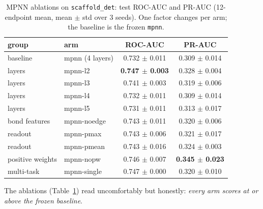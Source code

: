 \documentclass[conference]{IEEEtran}
\newcommand{\code}[1]{\texttt{\small #1}}
\begin{document}
\begin{table}[t]
\centering
\caption{MPNN ablations on \code{scaffold\_det}: test ROC-AUC and PR-AUC (12-endpoint mean,
mean $\pm$ std over 3 seeds). One factor changes per arm; the baseline is the frozen
\code{mpnn}.}
\label{tab:gnn-ablation}
\small
\begin{tabular}{llcc}
\toprule
group & arm & ROC-AUC & PR-AUC \\
\midrule
baseline & mpnn (4 layers) & 0.732 $\pm$ 0.011 & 0.309 $\pm$ 0.014 \\
\midrule
layers & mpnn-l2 & \textbf{0.747 $\pm$ 0.003} & 0.328 $\pm$ 0.004 \\
layers & mpnn-l3 & 0.741 $\pm$ 0.003 & 0.319 $\pm$ 0.006 \\
layers & mpnn-l4 & 0.732 $\pm$ 0.011 & 0.309 $\pm$ 0.014 \\
layers & mpnn-l5 & 0.731 $\pm$ 0.011 & 0.313 $\pm$ 0.017 \\
\midrule
bond features & mpnn-noedge & 0.743 $\pm$ 0.011 & 0.320 $\pm$ 0.006 \\
readout & mpnn-pmax & 0.743 $\pm$ 0.006 & 0.321 $\pm$ 0.017 \\
readout & mpnn-pmean & 0.743 $\pm$ 0.016 & 0.324 $\pm$ 0.003 \\
positive weights & mpnn-nopw & 0.746 $\pm$ 0.007 & \textbf{0.345 $\pm$ 0.023} \\
multi-task & mpnn-single & 0.747 $\pm$ 0.000 & 0.320 $\pm$ 0.010 \\
\bottomrule
\end{tabular}
\end{table}

The ablations (Table~\ref{tab:gnn-ablation}) read uncomfortably but honestly: \emph{every arm
scores at or above the frozen baseline}.
\end{document}
